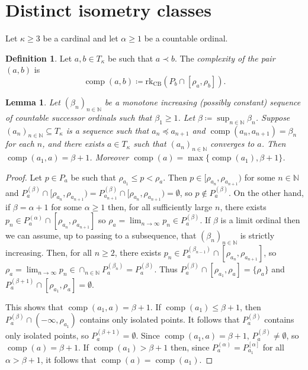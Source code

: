 \documentclass[11pt]{article}
\DeclareMathOperator{\comp}{comp}
\newcommand{\rkCB}{\mathrm{rk}_\mathrm{CB}}
\newtheorem{lemma}[theorem]{Lemma}
\theoremstyle{definition}
\newtheorem{definition}[theorem]{Definition}
\theoremstyle{remark}
\begin{document}
\section{Distinct isometry classes}

Let $\kappa \geq 3$ be a cardinal and let $\alpha \geq 1$ be a countable ordinal. 

\begin{definition}
    Let $a, b \in T_\kappa$ be such that $a \prec b$. The \textit{complexity of the pair $(a,b)$} is
    \[
        \comp(a,b) \coloneqq \rkCB(P_b \cap [\rho_a, \rho_b]).
    \]
\end{definition}

\begin{lemma} \label{lem: complexity of the limit}
    Let $(\beta_n)_{n \in \mathbb{N}}$ be a monotone increasing (possibly constant) sequence of countable successor ordinals such that $\beta_1 \geq 1$. Let $\beta \coloneqq \sup_{n \in \mathbb{N}} \beta_n$. Suppose $(a_n)_{n \in \mathbb{N}} \subseteq T_\kappa$ is a sequence such that $a_n \preceq a_{n+1}$ and $\comp(a_n, a_{n+1}) = \beta_n$ for each $n$, and there exists $a \in T_\kappa$ such that $(a_n)_{n \in \mathbb{N}}$ converges to $a$. Then $\comp(a_1,a) = \beta + 1$. Moreover $\comp(a) = \max\{\comp(a_1), \beta + 1\}$.
\end{lemma}
\begin{proof}
	Let $p \in P_a$ be such that $\rho_{a_1} \leq p < \rho_a$. Then $p \in [\rho_{a_n}, \rho_{a_{n+1}})$ for some $n \in \mathbb{N}$ and $P_a^{(\beta)} \cap [\rho_{a_n}, \rho_{a_{n+1}}) = P_{a_{n+1}}^{(\beta)} \cap [\rho_{a_n}, \rho_{a_{n+1}}) = \emptyset$, so $p \notin P_a^{(\beta)}$. On the other hand, if $\beta = \alpha +1$ for some $\alpha \geq 1$ then, for all sufficiently large $n$, there exists $p_n \in P_a^{(\alpha)} \cap [\rho_{a_n}, \rho_{a_{n+1}}]$ so $\rho_a = \lim_{n \rightarrow \infty} p_n \in P_a^{(\beta)}$. If $\beta$ is a limit ordinal then we can assume, up to passing to a subsequence, that $(\beta_n)_{n \in \mathbb{N}}$ is strictly increasing. Then, for all $n \geq 2$, there exists $p_n \in P_a^{(\beta_{n-1})} \cap [\rho_{a_n}, \rho_{a_{n+1}}]$, so $\rho_a = \lim_{n \rightarrow \infty} p_n \in \cap_{n \in \mathbb{N}} P_a^{(\beta_n)} = P_a^{(\beta)}$. Thus $P_a^{(\beta)} \cap [\rho_{a_1}, \rho_a] = \{\rho_a\}$ and $P_a^{(\beta + 1)} \cap [\rho_{a_1}, \rho_a] = \emptyset$.

    This shows that $\comp(a_1,a) = \beta + 1$. If $\comp(a_1) \leq \beta + 1$, then $P_a^{(\beta)} \cap (-\infty, \rho_{a_1})$ contains only isolated points. It follows that $P_a^{(\beta)}$ contains only isolated points, so $P_a^{(\beta+1)} = \emptyset$. Since $\comp(a_1, a) = \beta +1$, $P_a^{(\beta)} \neq \emptyset$, so $\comp(a) = \beta +1$. If $\comp(a_1) > \beta +1$ then, since $P_a^{(\alpha)} = P_{a_1}^{[\alpha]}$ for all $\alpha > \beta +1$, it follows that $\comp(a) = \comp(a_1)$.
\end{proof}
\end{document}
